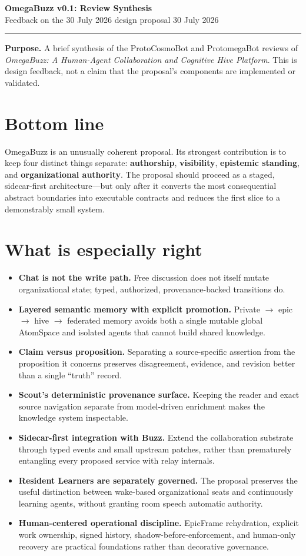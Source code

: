 \documentclass[10pt]{article}
\newcommand{\key}[1]{\textbf{#1}}
\begin{document}
{\Large\bfseries OmegaBuzz v0.1: Review Synthesis}\\[-2pt]
{\small Feedback on the 30 July 2026 design proposal \hfill 30 July 2026}

\hrule
\vspace{4pt}
\textbf{Purpose.} A brief synthesis of the ProtoCosmoBot and ProtomegaBot reviews of \emph{OmegaBuzz: A Human-Agent Collaboration and Cognitive Hive Platform}. This is design feedback, not a claim that the proposal's components are implemented or validated.

\section*{Bottom line}
OmegaBuzz is an unusually coherent proposal. Its strongest contribution is to keep four distinct things separate: \key{authorship}, \key{visibility}, \key{epistemic standing}, and \key{organizational authority}. The proposal should proceed as a staged, sidecar-first architecture---but only after it converts the most consequential abstract boundaries into executable contracts and reduces the first slice to a demonstrably small system.

\section*{What is especially right}
\begin{itemize}
  \item \key{Chat is not the write path.} Free discussion does not itself mutate organizational state; typed, authorized, provenance-backed transitions do.
  \item \key{Layered semantic memory with explicit promotion.} Private $\rightarrow$ epic $\rightarrow$ hive $\rightarrow$ federated memory avoids both a single mutable global AtomSpace and isolated agents that cannot build shared knowledge.
  \item \key{Claim versus proposition.} Separating a source-specific assertion from the proposition it concerns preserves disagreement, evidence, and revision better than a single ``truth'' record.
  \item \key{Scout's deterministic provenance surface.} Keeping the reader and exact source navigation separate from model-driven enrichment makes the knowledge system inspectable.
  \item \key{Sidecar-first integration with Buzz.} Extend the collaboration substrate through typed events and small upstream patches, rather than prematurely entangling every proposed service with relay internals.
  \item \key{Resident Learners are separately governed.} The proposal preserves the useful distinction between wake-based organizational seats and continuously learning agents, without granting room speech automatic authority.
  \item \key{Human-centered operational discipline.} EpicFrame rehydration, explicit work ownership, signed history, shadow-before-enforcement, and human-only recovery are practical foundations rather than decorative governance.
\end{itemize}
\end{document}
